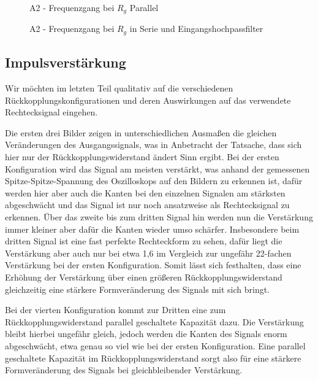 \documentclass{article}
\begin{document}
\begin{figure}[!p]
    \centering
    \caption{A2 - Frequenzgang bei $R_g$ Parallel}
    \label{fig:A2_2}
\end{figure}

\begin{figure}[!p]
    \centering
    \caption{A2 - Frequenzgang bei $R_g$ in Serie und Eingangshochpassfilter}
    \label{fig:A2_3}
\end{figure}

\clearpage
\newpage
\subsection{Impulsverstärkung}

Wir möchten im letzten Teil qualitativ auf die verschiedenen Rückkopplungskonfigurationen und deren Auswirkungen auf das verwendete Rechtecksignal eingehen. 

Die ersten drei Bilder zeigen in unterschiedlichen Ausmaßen die gleichen Veränderungen des Ausgangssignals, was in Anbetracht der Tatsache, dass sich hier nur der Rückkopplungswiderstand ändert Sinn ergibt. Bei der ersten Konfiguration wird das Signal am meisten verstärkt, was anhand der gemessenen Spitze-Spitze-Spannung des Oszilloskops auf den Bildern zu erkennen ist, dafür werden hier aber auch die Kanten bei den einzelnen Signalen am stärksten abgeschwächt und das Signal ist nur noch ansatzweise als Rechtecksignal zu erkennen. Über das zweite bis zum dritten Signal hin werden nun die Verstärkung immer kleiner aber dafür die Kanten wieder umso schärfer. Insbesondere beim dritten Signal ist eine fast perfekte Rechteckform zu sehen, dafür liegt die Verstärkung aber auch nur bei etwa 1,6 im Vergleich zur ungefähr 22-fachen Verstärkung bei der ersten Konfiguration. Somit lässt sich festhalten, dass eine Erhöhung der Verstärkung über einen größeren Rückkopplungswiderstand gleichzeitig eine stärkere Formveränderung des Signals mit sich bringt.

Bei der vierten Konfiguration kommt zur Dritten eine zum Rückkopplungswiderstand parallel geschaltete Kapazität dazu. Die Verstärkung bleibt hierbei ungefähr gleich, jedoch werden die Kanten des Signals enorm abgeschwächt, etwa genau so viel wie bei der ersten Konfiguration. Eine parallel geschaltete Kapazität im Rückkopplungswiderstand sorgt also für eine stärkere Formveränderung des Signals bei gleichbleibender Verstärkung. 
\end{document}
